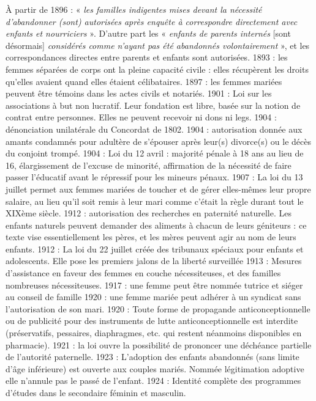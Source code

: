  À partir de 1896 : « \emph{les familles indigentes mises devant la nécessité d'abandonner (sont) autorisées après enquête à correspondre directement avec enfants et nourriciers} ». D'autre part les « \emph{enfants de parents internés} [sont désormais] \emph{considérés comme n'ayant pas été abandonnés volontairement} », et les correspondances directes entre parents et enfants sont autorisées.
 1893 : les femmes séparées de corps ont la pleine capacité civile : elles récupèrent les droits qu'elles avaient quand elles étaient célibataires.
 1897 : les femmes mariées peuvent être témoins dans les actes civils et notariés.
 1901 : Loi sur les associations à but non lucratif. Leur fondation est libre, basée sur la notion de contrat entre personnes. Elles ne peuvent recevoir ni dons ni legs.
 1904 : dénonciation unilatérale du Concordat de 1802.
 1904 : autorisation donnée aux amants condamnés pour adultère de s'épouser après leur(s) divorce(s) ou le décès du conjoint trompé.
 1904 : Loi du 12 avril : majorité pénale à 18 ans au lieu de 16, élargissement de l'excuse de minorité, affirmation de la nécessité de faire passer l'éducatif avant le répressif pour les mineurs pénaux.
 1907 : La loi du 13 juillet permet aux femmes mariées de toucher et de gérer elles-mêmes leur propre salaire, au lieu qu'il soit remis à leur mari comme c'était la règle durant tout le XIXème siècle. 
 1912 : autorisation des recherches en paternité naturelle. Les enfants naturels peuvent demander des aliments à chacun de leurs géniteurs : ce texte vise essentiellement les pères, et les mères peuvent agir au nom de leurs enfants. 
 1912 : La loi du 22 juillet créée des tribunaux spéciaux pour enfants et adolescents. Elle pose les premiers jalons de la liberté surveillée
 1913 : Mesures d'assistance en faveur des femmes en couche nécessiteuses, et des familles nombreuses nécessiteuses.
 1917 : une femme peut être nommée tutrice et siéger au conseil de famille
 1920 : une femme mariée peut adhérer à un syndicat sans l'autorisation de son mari.
 1920 : Toute forme de propagande anticonceptionnelle ou de publicité pour des instruments de lutte anticonceptionnelle est interdite (préservatifs, pessaires, diaphragmes, etc. qui restent néanmoins disponibles en pharmacie).
 1921 : la loi ouvre la possibilité de prononcer une déchéance partielle de l'autorité paternelle. 
 1923 : L'adoption des enfants abandonnés (sans limite d'âge inférieure) est ouverte aux couples mariés. Nommée légitimation adoptive elle n'annule pas le passé de l'enfant.
 1924 : Identité complète des programmes d'études dans le secondaire féminin et masculin.
